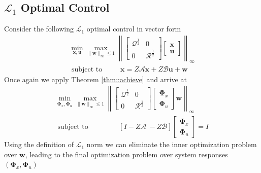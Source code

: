 \documentclass{article}[12pt]
\begin{document}
\subsection{$\mathcal{L}_1$ Optimal Control}
Consider the following $\mathcal{L}_1$ optimal control in vector form
\begin{equation}
    \begin{array}{c}{\min _{\mathbf{x}, \mathbf{u}} \max _{\|\mathbf{w}\|_{\infty} \leq 1}\left\|\left[\begin{array}{cc}{\mathcal{Q}^{\frac{1}{2}}} & {0} \\ {0} & {\mathcal{R}^{\frac{1}{2}}}\end{array}\right]\left[\begin{array}{c}{\mathbf{x}} \\ {\mathbf{u}}\end{array}\right]  \right\|_{\infty}} \\ {\text { subject to } \qquad \ \mathbf{x}=Z \mathcal{A} \mathbf{x}+Z \mathcal{B} \mathbf{u}+\mathbf{w}}\end{array}
\end{equation}
Once again we apply Theorem \ref{thm::achieve} and arrive at
\begin{equation}
    \begin{array}{c}{\min _{\mathbf{\Phi}_{x}, \mathbf{\Phi}_{u}} \max _{\|\mathbf{w}\|_{\infty} \leq 1}\left\|\left[\begin{array}{cc}{\mathcal{Q}^{\frac{1}{2}}} & {0} \\ {0} & {\mathcal{R}^{\frac{1}{2}}}\end{array}\right]\left[\begin{array}{c}{\mathbf{\Phi}_{x}} \\ {\mathbf{\Phi}_{u}}\end{array}\right] \mathbf{w} \right\|_{\infty}} \\ {\text { subject to } \qquad \qquad [I-Z \mathcal{A} \ -Z \mathcal{B}]\left[\begin{array}{c}{\mathbf{\Phi}_{x}} \\ {\mathbf{\Phi}_{u}}\end{array}\right]=I}\end{array}
\end{equation}
Using the definition of $\mathcal{L}_1$ norm we can eliminate the inner optimization problem over $\mathbf{w}$, leading to the
final optimization problem over system responses $(\mathbf{\Phi}_{x}, \mathbf{\Phi}_u)$
\end{document}
